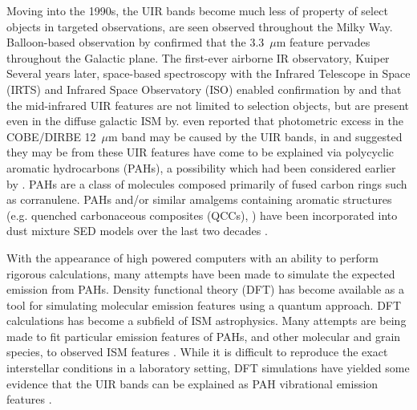     Moving into the 1990s, the UIR bands become much less of property of select objects in targeted observations, are seen observed throughout the Milky Way. Balloon-based observation by \cite{giard94} confirmed that the 3.3~$\mu$m feature pervades throughout the Galactic plane. The first-ever airborne IR observatory, Kuiper Several years later, space-based spectroscopy with the Infrared Telescope in Space (IRTS)\citep{murakami96} and Infrared Space Observatory (ISO)\citep{kessler96} enabled confirmation by \cite{onaka96} and \cite{mattila96} that the mid-infrared UIR features are not limited to selection objects, but are present even in the diffuse galactic ISM by. \cite{dwek97} even reported that photometric excess in the COBE/DIRBE 12~$\mu$m band may be caused by the UIR bands, in and suggested they may be from these UIR features have come to be explained via polycyclic aromatic hydrocarbons (PAHs), a possibility which had been considered earlier by \cite{allamandola85,puget85}. PAHs are a class of molecules composed primarily of fused carbon rings such as corranulene. PAHs and/or similar amalgems containing aromatic structures (e.g. quenched carbonaceous composites (QCCs), \cite{sakata84}) have been incorporated into dust mixture SED models over the last two decades \citep{drli01, drli07, hony01, dustem11, galliano11, jones13, jones17}.

     With the appearance of high powered computers with an ability to perform rigorous calculations, many attempts have been made to simulate the expected emission from PAHs. Density functional theory (DFT) \citep{honenberg64} has become available as a tool for simulating molecular emission features using a quantum approach. DFT calculations has become a subfield of ISM astrophysics. Many attempts are being made to fit particular emission features of PAHs, and other molecular and grain species, to observed ISM features \citep{hammonds09,hirata99}.
     While it is difficult to reproduce the exact interstellar conditions in a laboratory setting, DFT simulations have yielded some evidence that the UIR bands can be explained as PAH vibrational emission features \citep{pathak12,ricca11,yu12}.

